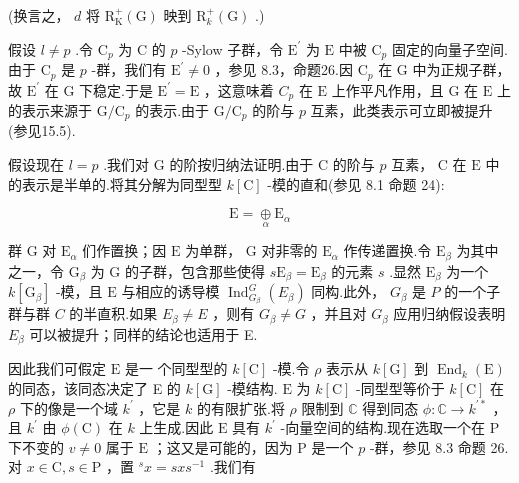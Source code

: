 \documentclass[10pt]{article}
\begin{document}
(换言之， \(d\) 将 \({\mathrm{R}}_{\mathrm{K}}^{ + }\left( \mathrm{G}\right)\) 映到 \({\mathrm{R}}_{k}^{ + }\left( \mathrm{G}\right)\) .)

假设 \(l \neq  p\) .令 \({\mathrm{C}}_{p}\) 为 \(\mathrm{C}\) 的 \(p\) -Sylow 子群，令 \({\mathrm{E}}^{\prime }\) 为 \(\mathrm{E}\) 中被 \({\mathrm{C}}_{p}\) 固定的向量子空间.由于 \({\mathrm{C}}_{p}\) 是 \(p\) -群，我们有 \({\mathrm{E}}^{\prime } \neq  0\) ，参见 8.3，命题26.因 \({\mathrm{C}}_{p}\) 在 \(\mathrm{G}\) 中为正规子群，故 \({\mathrm{E}}^{\prime }\) 在 \(\mathrm{G}\) 下稳定.于是 \({\mathrm{E}}^{\prime } = \mathrm{E}\) ，这意味着 \({C}_{p}\) 在 \(\mathrm{E}\) 上作平凡作用，且 \(\mathrm{G}\) 在 \(\mathrm{E}\) 上的表示来源于 \(\mathrm{G}/{\mathrm{C}}_{p}\) 的表示.由于 \(\mathrm{G}/{\mathrm{C}}_{p}\) 的阶与 \(p\) 互素，此类表示可立即被提升(参见15.5).

假设现在 \(l = p\) .我们对 \(\mathrm{G}\) 的阶按归纳法证明.由于 \(\mathrm{C}\) 的阶与 \(p\) 互素， \(\mathrm{C}\) 在 \(\mathrm{E}\) 中的表示是半单的.将其分解为同型型 \(k\left\lbrack  \mathrm{C}\right\rbrack\) -模的直和(参见 8.1 命题 24):

\[
\mathrm{E} = \underset{\alpha }{ \oplus  }{\mathrm{E}}_{\alpha }
\]

群 \(\mathrm{G}\) 对 \({\mathrm{E}}_{\alpha }\) 们作置换；因 \(\mathrm{E}\) 为单群， \(\mathrm{G}\) 对非零的 \({\mathrm{E}}_{\alpha }\) 作传递置换.令 \({\mathrm{E}}_{\beta }\) 为其中之一，令 \({\mathrm{G}}_{\beta }\) 为 \(\mathrm{G}\) 的子群，包含那些使得 \(s{\mathrm{E}}_{\beta } = {\mathrm{E}}_{\beta }\) 的元素 \(s\) .显然 \({\mathrm{E}}_{\beta }\) 为一个 \(k\left\lbrack  {\mathrm{G}}_{\beta }\right\rbrack\) -模，且 \(\mathrm{E}\) 与相应的诱导模 \({\operatorname{Ind}}_{{G}_{\beta }}^{G}\left( {E}_{\beta }\right)\) 同构.此外， \({G}_{\beta }\) 是 \(P\) 的一个子群与群 \(C\) 的半直积.如果 \({E}_{\beta } \neq  E\) ，则有 \({G}_{\beta } \neq  G\) ，并且对 \({G}_{\beta }\) 应用归纳假设表明 \({E}_{\beta }\) 可以被提升；同样的结论也适用于 E.

因此我们可假定 \(\mathrm{E}\) 是一 个同型型的 \(k\left\lbrack  \mathrm{C}\right\rbrack\) -模.令 \(\rho\) 表示从 \(k\left\lbrack  \mathrm{G}\right\rbrack\) 到 \({\operatorname{End}}_{k}\left( \mathrm{E}\right)\) 的同态，该同态决定了 E 的 \(k\left\lbrack  \mathrm{G}\right\rbrack\) -模结构. \(\mathrm{E}\) 为 \(k\left\lbrack  \mathrm{C}\right\rbrack\) -同型型等价于 \(k\left\lbrack  \mathrm{C}\right\rbrack\) 在 \(\rho\) 下的像是一个域 \({k}^{\prime }\) ，它是 \(k\) 的有限扩张.将 \(\rho\) 限制到 \(\mathbb{C}\) 得到同态 \(\phi  : \mathbb{C} \rightarrow  {k}^{\prime  * }\) ，且 \({k}^{\prime }\) 由 \(\phi \left( \mathrm{C}\right)\) 在 \(k\) 上生成.因此 \(\mathrm{E}\) 具有 \({k}^{\prime }\) -向量空间的结构.现在选取一个在 \(\mathrm{P}\) 下不变的 \(v \neq  0\) 属于 \(\mathrm{E}\) ；这又是可能的，因为 \(\mathrm{P}\) 是一个 \(p\) -群，参见 8.3 命题 26.对 \(x \in  \mathrm{C},s \in  \mathrm{P}\) ，置 \({}^{s}x = {sx}{s}^{-1}\) .我们有
\end{document}
